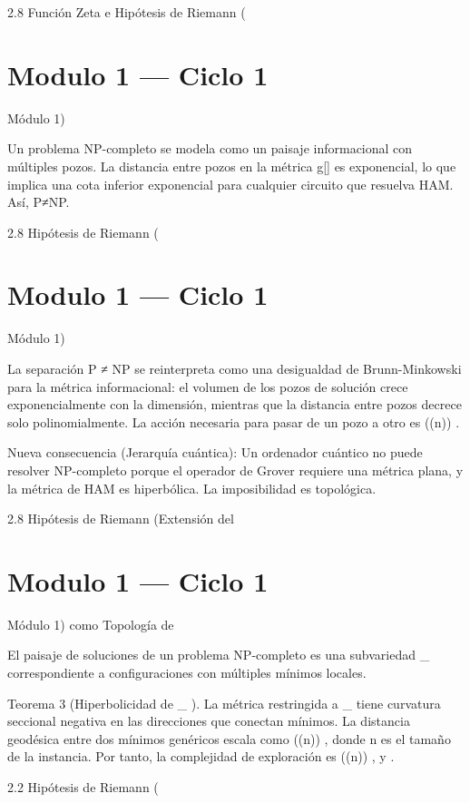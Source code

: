 \documentclass[12pt,twoside]{book}
\begin{document}
2.8 Función Zeta e Hipótesis de Riemann (

\chapter{Modulo 1 — Ciclo 1}
Módulo 1)

Un problema NP-completo se modela como un paisaje informacional con múltiples pozos. La distancia entre pozos en la métrica  g[\rho]  es exponencial, lo que implica una cota inferior exponencial para cualquier circuito que resuelva HAM. Así, P≠NP.

2.8 Hipótesis de Riemann (

\chapter{Modulo 1 — Ciclo 1}
Módulo 1)

La separación P ≠ NP se reinterpreta como una desigualdad de Brunn-Minkowski para la métrica informacional: el volumen de los pozos de solución crece exponencialmente con la dimensión, mientras que la distancia entre pozos decrece solo polinomialmente. La acción necesaria para pasar de un pozo a otro es  \exp(\Omega(n)) .

Nueva consecuencia (Jerarquía cuántica): Un ordenador cuántico no puede resolver NP-completo porque el operador de Grover requiere una métrica plana, y la métrica de HAM es hiperbólica. La imposibilidad es topológica.

2.8 Hipótesis de Riemann (Extensión del 

\chapter{Modulo 1 — Ciclo 1}
Módulo 1) como Topología de   

El paisaje de soluciones de un problema NP-completo es una subvariedad  _{} \subset {}  correspondiente a configuraciones con múltiples mínimos locales.

Teorema 3 (Hiperbolicidad de  _{} ). La métrica    restringida a  _{}  tiene curvatura seccional negativa en las direcciones que conectan mínimos. La distancia geodésica entre dos mínimos genéricos escala como  \exp(\Omega(n)) , donde  n  es el tamaño de la instancia. Por tanto, la complejidad de exploración es  \exp(\Omega(n)) , y   .

2.2 Hipótesis de Riemann (
\end{document}
